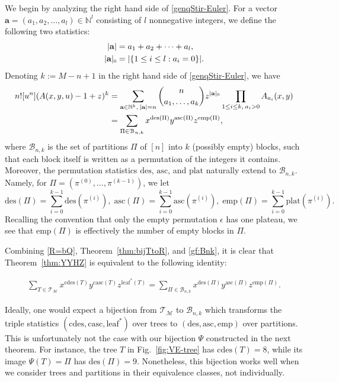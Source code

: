 \documentclass[11pt,reqno]{amsart}
\numberwithin{equation}{section}
\theoremstyle{plain}
\theoremstyle{definition}
\newcommand{\N}{\mathbb{N}}
\newcommand{\M}{\mathcal{M}}
\newcommand{\T}{\mathcal{T}}
\newcommand{\B}{\mathcal{B}}
\def\des{\mathrm{des}}
\def\asc{\mathrm{asc}}
\def\cdes{\mathrm{cdes}}
\def\casc{\mathrm{casc}}
\def\plat{\mathrm{plat}}
\def\lleaf{\mathrm{leaf}^*}
\def\emp{\mathrm{emp}}
\begin{document}
We begin by analyzing the right hand side of \eqref{genqStir-Euler}. For a vector $\mathbf{a}=(a_1,a_2,\ldots,a_l)\in \N^l$ consisting of $l$ nonnegative integers, we define the following two statistics:
\begin{align*}
|\mathbf{a}| &=a_1+a_2+\cdots+a_l,\\
|\mathbf{a}|_{\scaleto{0}{3.5pt}} &= |\{1\le i\le l:a_i=0\}|.
\end{align*}
Denoting $k:=M-n+1$ in the right hand side of \eqref{genqStir-Euler}, we have
\begin{align}
n![u^n](A(x,y,u)-1+z)^k &= \sum_{\mathbf{a}\in\N^{k},\:|\mathbf{a}|=n}\binom{n}{a_1,\ldots,a_k}z^{|\mathbf{a}|_{\scaleto{0}{3pt}}}\prod_{1\le i\le k,\:a_i>0}A_{a_i}(x,y) \nonumber \\
&=\sum_{\Pi\in\B_{n,k}}x^{\des(\Pi)}y^{\asc(\Pi)}z^{\emp(\Pi)},\label{gf:Bnk}
\end{align}
where $\B_{n,k}$ is the set of partitions $\Pi$ of $[n]$ into $k$ (possibly empty) blocks, such that each block itself is written as a permutation of the integers it contains. Moreover, the permutation statistics $\des$, $\asc$, and $\plat$ naturally extend to $\B_{n,k}$. Namely, for $\Pi=(\pi^{(0)},\ldots,\pi^{(k-1)})$, we let
$$\des(\Pi)=\sum_{i=0}^{k-1} \des(\pi^{(i)}),\; \asc(\Pi)=\sum_{i=0}^{k-1} \asc(\pi^{(i)}),\; \emp(\Pi)=\sum_{i=0}^{k-1} \plat(\pi^{(i)}).$$
Recalling the convention that only the empty permutation $\epsilon$ has one plateau, we see that $\emp(\Pi)$ is effectively the number of empty blocks in $\Pi$.


Combining \eqref{R=bQ}, Theorem~\ref{thm:bijTtoR}, and \eqref{gf:Bnk}, it is clear that Theorem~\ref{thm:YYHZ} is equivalent to the following identity:

\begin{align}\label{triplestat:T=B}
\sum_{T\in\T_{\M}}x^{\cdes(T)}y^{\casc(T)}z^{\lleaf(T)}=\sum_{\Pi\in\B_{n,k}}x^{\des(\Pi)}y^{\asc(\Pi)}z^{\emp(\Pi)}.
\end{align}

Ideally, one would expect a bijection from $\T_{\M}$ to $\B_{n,k}$ which transforms the triple statistics $(\cdes,\casc,\lleaf)$ over trees to $(\des,\asc,\emp)$ over partitions. This is unfortunately not the case with our bijection $\Psi$ constructed in the next theorem. For instance, the tree $T$ in Fig.~\ref{fig:VE-tree} has $\cdes(T)=8$, while its image $\Psi(T)=\Pi$ has $\des(\Pi)=9$. Nonetheless, this bijection works well when we consider trees and partitions in their equivalence classes, not individually.
\end{document}
